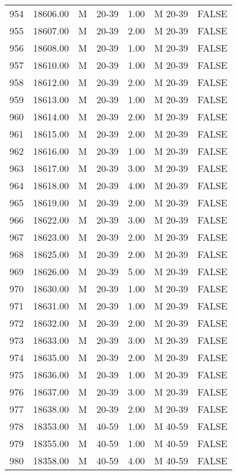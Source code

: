 \begin{table}[ht]
\begin{tabular}{rrllrll}
  954 & 18606.00 & M & 20-39 & 1.00 & M 20-39 & FALSE \\ 
  955 & 18607.00 & M & 20-39 & 2.00 & M 20-39 & FALSE \\ 
  956 & 18608.00 & M & 20-39 & 1.00 & M 20-39 & FALSE \\ 
  957 & 18610.00 & M & 20-39 & 1.00 & M 20-39 & FALSE \\ 
  958 & 18612.00 & M & 20-39 & 2.00 & M 20-39 & FALSE \\ 
  959 & 18613.00 & M & 20-39 & 1.00 & M 20-39 & FALSE \\ 
  960 & 18614.00 & M & 20-39 & 2.00 & M 20-39 & FALSE \\ 
  961 & 18615.00 & M & 20-39 & 2.00 & M 20-39 & FALSE \\ 
  962 & 18616.00 & M & 20-39 & 1.00 & M 20-39 & FALSE \\ 
  963 & 18617.00 & M & 20-39 & 3.00 & M 20-39 & FALSE \\ 
  964 & 18618.00 & M & 20-39 & 4.00 & M 20-39 & FALSE \\ 
  965 & 18619.00 & M & 20-39 & 2.00 & M 20-39 & FALSE \\ 
  966 & 18622.00 & M & 20-39 & 3.00 & M 20-39 & FALSE \\ 
  967 & 18623.00 & M & 20-39 & 2.00 & M 20-39 & FALSE \\ 
  968 & 18625.00 & M & 20-39 & 2.00 & M 20-39 & FALSE \\ 
  969 & 18626.00 & M & 20-39 & 5.00 & M 20-39 & FALSE \\ 
  970 & 18630.00 & M & 20-39 & 1.00 & M 20-39 & FALSE \\ 
  971 & 18631.00 & M & 20-39 & 1.00 & M 20-39 & FALSE \\ 
  972 & 18632.00 & M & 20-39 & 2.00 & M 20-39 & FALSE \\ 
  973 & 18633.00 & M & 20-39 & 3.00 & M 20-39 & FALSE \\ 
  974 & 18635.00 & M & 20-39 & 2.00 & M 20-39 & FALSE \\ 
  975 & 18636.00 & M & 20-39 & 1.00 & M 20-39 & FALSE \\ 
  976 & 18637.00 & M & 20-39 & 3.00 & M 20-39 & FALSE \\ 
  977 & 18638.00 & M & 20-39 & 2.00 & M 20-39 & FALSE \\ 
  978 & 18353.00 & M & 40-59 & 1.00 & M 40-59 & FALSE \\ 
  979 & 18355.00 & M & 40-59 & 1.00 & M 40-59 & FALSE \\ 
  980 & 18358.00 & M & 40-59 & 4.00 & M 40-59 & FALSE \\ 

\end{tabular}
\end{table}
